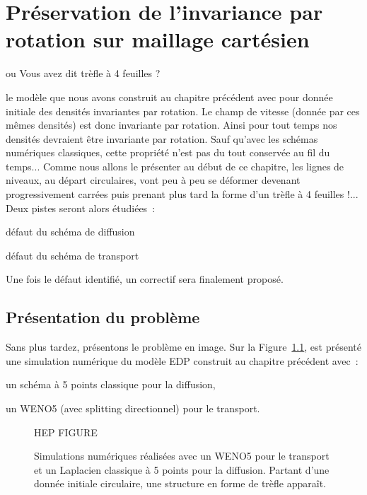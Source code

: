 \documentclass[main.tex]{subfiles}
\begin{document}
\chapter{Préservation de l'invariance par rotation sur maillage cartésien}
\vspace{-13mm}
\begin{flushright}
{ \Large\sf ou Vous avez dit trèfle à 4 feuilles ?\ }
\end{flushright}
%

 le modèle que nous avons construit au chapitre précédent avec pour donnée initiale des densités invariantes par rotation. Le champ de vitesse (donnée par ces mêmes densités) est donc invariante par rotation. Ainsi pour tout temps nos densités devraient être invariante par rotation. Sauf qu'avec les schémas numériques classiques, cette propriété n'est pas du tout conservée au fil du temps... Comme nous allons le présenter au début de ce chapitre, les lignes de niveaux, au départ circulaires, vont peu à peu se déformer devenant progressivement carrées puis prenant plus tard la forme d'un trèfle à 4 feuilles !... Deux pistes seront alors étudiées~:
\begin{myitemize}
\item défaut du schéma de diffusion
\item défaut du schéma de transport
\end{myitemize}


\noindent Une fois le défaut identifié, un correctif sera finalement proposé. 

\section{Présentation du problème}
Sans plus tardez, présentons le problème en image. Sur la Figure~\ref{fig:trefle}, est présenté une simulation numérique du modèle EDP construit au chapitre précédent avec~:
\begin{myitemize}
\item un schéma à 5 points classique pour la diffusion,
\item un WENO5 (avec splitting directionnel) pour le transport.
\end{myitemize}
\begin{figure}
\centering
HEP FIGURE
\caption{\label{fig:trefle} Simulations numériques réalisées avec un WENO5 pour le transport et un Laplacien classique à 5 points pour la diffusion. Partant d'une donnée initiale circulaire, 
une structure en forme de trèfle apparaît.}
\end{figure}
\end{document}
